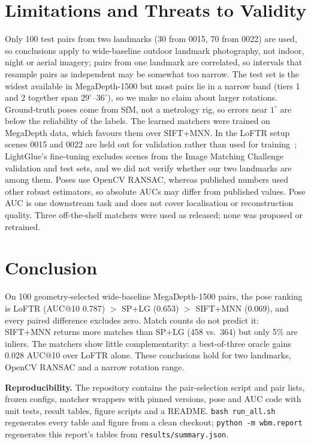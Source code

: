 \documentclass[10pt,twocolumn,letterpaper]{article}
\newcommand{\dg}{^{\circ}}
\begin{document}
\section{Limitations and Threats to Validity}
Only 100 test pairs from two landmarks (30 from 0015, 70 from 0022) are used, so conclusions apply to wide-baseline outdoor landmark photography, not indoor, night or aerial imagery; pairs from one landmark are correlated, so intervals that resample pairs as independent may be somewhat too narrow. The test set is the widest available in MegaDepth-1500 but most pairs lie in a narrow band (tiers 1 and 2 together span $29\dg$--$36\dg$), so we make no claim about larger rotations. Ground-truth poses come from SfM, not a metrology rig, so errors near $1\dg$ are below the reliability of the labels. The learned matchers were trained on MegaDepth data, which favours them over SIFT+MNN. In the LoFTR setup scenes 0015 and 0022 are held out for validation rather than used for training~\cite{loftr}; LightGlue's fine-tuning excludes scenes from the Image Matching Challenge validation and test sets, and we did not verify whether our two landmarks are among them. Poses use OpenCV RANSAC, whereas published numbers used other robust estimators, so absolute AUCs may differ from published values. Pose AUC is one downstream task and does not cover localisation or reconstruction quality. Three off-the-shelf matchers were used as released; none was proposed or retrained.

\section{Conclusion}
On 100 geometry-selected wide-baseline MegaDepth-1500 pairs, the pose ranking is LoFTR (AUC@10 0.787) $>$ SP+LG (0.653) $>$ SIFT+MNN (0.069), and every paired difference excludes zero. Match counts do not predict it: SIFT+MNN returns more matches than SP+LG (458 vs.\ 364) but only 5\% are inliers. The matchers show little complementarity: a best-of-three oracle gains 0.028 AUC@10 over LoFTR alone. These conclusions hold for two landmarks, OpenCV RANSAC and a narrow rotation range.

\noindent\textbf{Reproducibility.} The repository contains the pair-selection script and pair lists, frozen configs, matcher wrappers with pinned versions, pose and AUC code with unit tests, result tables, figure scripts and a README. \texttt{bash run\_all.sh} regenerates every table and figure from a clean checkout; \texttt{python -m wbm.report} regenerates this report's tables from \texttt{results/summary.json}.
\end{document}

